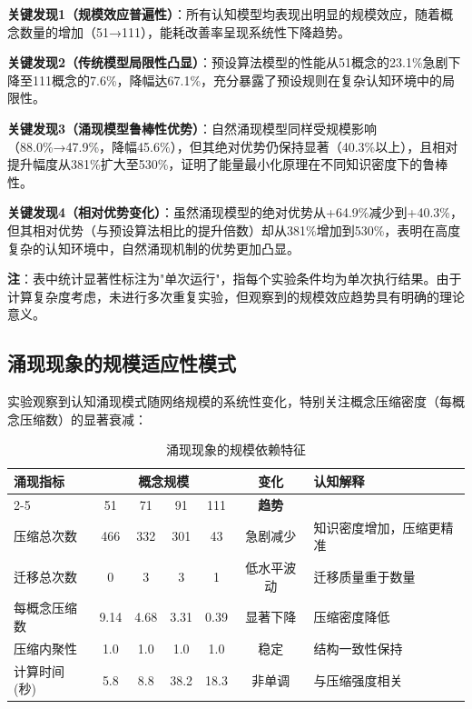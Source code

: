 \documentclass[12pt,a4paper]{article}
\begin{document}
\textbf{关键发现1（规模效应普遍性）}：所有认知模型均表现出明显的规模效应，随着概念数量的增加（51→111），能耗改善率呈现系统性下降趋势。

\textbf{关键发现2（传统模型局限性凸显）}：预设算法模型的性能从51概念的23.1\%急剧下降至111概念的7.6\%，降幅达67.1\%，充分暴露了预设规则在复杂认知环境中的局限性。

\textbf{关键发现3（涌现模型鲁棒性优势）}：自然涌现模型同样受规模影响（88.0\%→47.9\%，降幅45.6\%），但其绝对优势仍保持显著（40.3\%以上），且相对提升幅度从381\%扩大至530\%，证明了能量最小化原理在不同知识密度下的鲁棒性。

\textbf{关键发现4（相对优势变化）}：虽然涌现模型的绝对优势从+64.9\%减少到+40.3\%，但其相对优势（与预设算法相比的提升倍数）却从381\%增加到530\%，表明在高度复杂的认知环境中，自然涌现机制的优势更加凸显。

\textbf{注}：表中统计显著性标注为"单次运行"，指每个实验条件均为单次执行结果。由于计算复杂度考虑，未进行多次重复实验，但观察到的规模效应趋势具有明确的理论意义。

\subsection{涌现现象的规模适应性模式}

实验观察到认知涌现模式随网络规模的系统性变化，特别关注概念压缩密度（每概念压缩数）的显著衰减：

\begin{table}[h]
\centering
\caption{涌现现象的规模依赖特征}
\label{tab:scale_dependent_emergence}
\begin{tabular}{p{2cm}cccccp{2.8cm}}  %
\toprule
\textbf{涌现指标} & \multicolumn{4}{c}{\textbf{概念规模}} & \textbf{变化} & \textbf{认知解释} \\
\cmidrule(lr){2-5}
 & 51 & 71 & 91 & 111 & \textbf{趋势} & \\
\midrule
压缩总次数 & 466 & 332 & 301 & 43 & 急剧减少 & 知识密度增加，压缩更精准 \\
迁移总次数 & 0 & 3 & 3 & 1 & 低水平波动 & 迁移质量重于数量 \\
每概念压缩数 & 9.14 & 4.68 & 3.31 & 0.39 & 显著下降 & 压缩密度降低 \\
压缩内聚性 & 1.0 & 1.0 & 1.0 & 1.0 & 稳定 & 结构一致性保持 \\
计算时间(秒) & 5.8 & 8.8 & 38.2 & 18.3 & 非单调 & 与压缩强度相关 \\
\bottomrule
\end{tabular}
\end{table}
\end{document}
